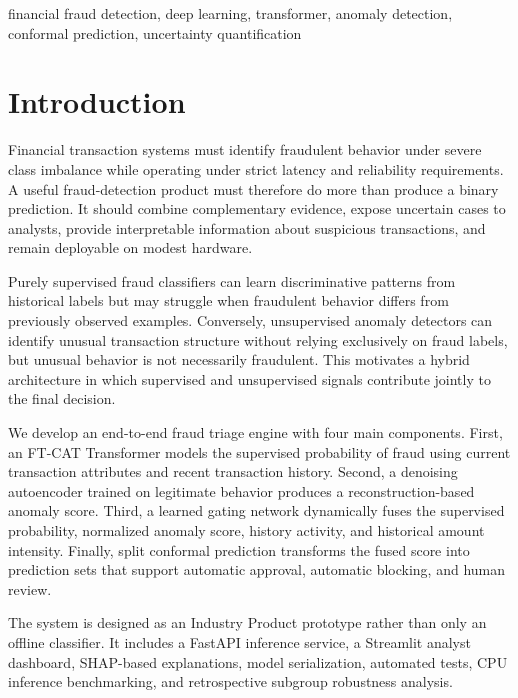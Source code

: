 \documentclass[conference]{IEEEtran}
\begin{document}
\begin{IEEEkeywords}
financial fraud detection, deep learning, transformer, anomaly detection,
conformal prediction, uncertainty quantification
\end{IEEEkeywords}

\section{Introduction}
\label{sec:intro}

Financial transaction systems must identify fraudulent behavior under severe
class imbalance while operating under strict latency and reliability
requirements. A useful fraud-detection product must therefore do more than
produce a binary prediction. It should combine complementary evidence, expose
uncertain cases to analysts, provide interpretable information about suspicious
transactions, and remain deployable on modest hardware.

Purely supervised fraud classifiers can learn discriminative patterns from
historical labels but may struggle when fraudulent behavior differs from
previously observed examples. Conversely, unsupervised anomaly detectors can
identify unusual transaction structure without relying exclusively on fraud
labels, but unusual behavior is not necessarily fraudulent. This motivates a
hybrid architecture in which supervised and unsupervised signals contribute
jointly to the final decision.

We develop an end-to-end fraud triage engine with four main components. First,
an FT-CAT Transformer models the supervised probability of fraud using current
transaction attributes and recent transaction history. Second, a denoising
autoencoder trained on legitimate behavior produces a reconstruction-based
anomaly score. Third, a learned gating network dynamically fuses the supervised
probability, normalized anomaly score, history activity, and historical amount
intensity. Finally, split conformal prediction transforms the fused score into
prediction sets that support automatic approval, automatic blocking, and human
review.

The system is designed as an Industry Product prototype rather than only an
offline classifier. It includes a FastAPI inference service, a Streamlit
analyst dashboard, SHAP-based explanations, model serialization, automated
tests, CPU inference benchmarking, and retrospective subgroup robustness
analysis.
\end{document}
